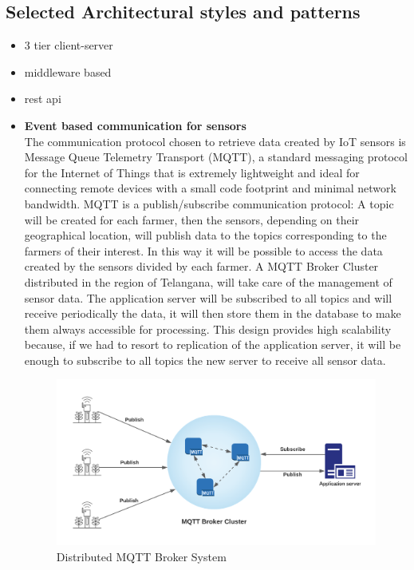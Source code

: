\documentclass[10pt]{article} %
\begin{document}
\subsection{Selected Architectural styles and patterns}
\begin{itemize}
    \item 3 tier client-server
    \item middleware based
    \item rest api  
    \item \textbf{Event based communication for sensors}\\The communication protocol chosen to retrieve 
    data created by IoT sensors is Message Queue Telemetry Transport (MQTT), a standard messaging 
    protocol for the Internet of Things that is extremely lightweight and ideal for connecting remote 
    devices with a small code footprint and minimal network bandwidth. MQTT is a publish/subscribe 
    communication protocol: A topic will be created for each farmer, then the sensors, depending on 
    their geographical location, will publish data to the topics corresponding to the farmers of 
    their interest. In this way it will be possible to access the data created by the sensors divided 
    by each farmer. A MQTT Broker Cluster distributed in the region of Telangana, will take care of 
    the management of sensor data. The application server will be subscribed to all topics and will 
    receive periodically the data, it will then store them in the database to make them always 
    accessible for processing.
    This design provides high scalability because, if we had to resort to replication of the 
    application server, it will be enough to subscribe to all topics the new server to receive 
    all sensor data.
    \begin{figure}[h]
        \centering
        \includegraphics[scale=0.5]{images/mqtt.png}
        \caption{Distributed MQTT Broker System}
        \label{fig:ui_login}
    \end{figure}
\end{itemize}
\end{document}
